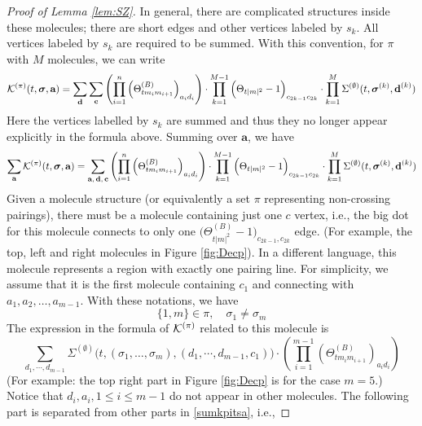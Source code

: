 \documentclass[10pt,reqno]{article}
\theoremstyle{plain} %
\theoremstyle{remark}
\numberwithin{equation}{section}
\begin{document}
\begin{proof}[ Proof of Lemma  \ref{lem:SZ}]
In general, there are complicated structures inside these molecules; there are short edges and other vertices labeled by $s_k$. All vertices labeled by $s_k$
 are required to be summed. 
With this convention,  for $\pi$  with   $M$ molecules, we can write 
\begin{align}\label{KThThSigma}
{\cal K}^{(\pi)}(t, \boldsymbol{\sigma}, \textbf{a})= 
\sum_{\textbf{d}}\sum_{\textbf{c}}\left(\prod_{i=1}^{n} \left(\Theta^{(B)}_{tm_im_{i+1}}\right)_{a_id_i}\right)\cdot \prod_{k=1}^{M-1}\Big(\Theta_{{t|m|^2}}-1\Big)_{c_{2k-1}c_{2k}}
\cdot
 \prod_{k=1}^{M}{\Sigma}^{(\emptyset)}(t, \boldsymbol{\sigma}^{(k)}, \textbf{d}^{(k)})   
\end{align}
Here the vertices labelled by $s_k$ are summed and thus they no longer appear explicitly in the formula above. 
Summing over  $\textbf{a}$,  we have 
\begin{align}\label{sumkpitsa}
\sum_{\textbf{a}}{\cal K}^{(\pi)}(t, \boldsymbol{\sigma}, \textbf{a})=
\sum_{\textbf{a},\,\textbf{d},\,\textbf{c}}\left(\prod_{i=1}^{n}  \left(\Theta^{(B)}_{tm_im_{i+1}}\right)_{a_id_i}\right)\cdot \prod_{k=1}^{M-1}\Big(\Theta_{{t|m|^2}}-1\Big)_{c_{2k-1}c_{2k}}
\cdot
 \prod_{k=1}^{M}{\Sigma}^{(\emptyset)}(t, \boldsymbol{\sigma}^{(k)}, \textbf{d}^{(k)})   
\end{align}
 Given a molecule structure (or equivalently a set $\pi$ representing non-crossing pairings), there must be a molecule  containing just one $c$ vertex, i.e., the big dot for this molecule  connects to only  one  $\big(\Theta^{(B)}_{t|m|^2}-1\big)_{c_{2k-1},c_{2k}}$ edge. (For example, the top, left and right molecules in Figure \ref{fig:Decp}). 
  In a different language, this molecule represents a region with exactly  one  pairing line.  
For simplicity, we assume that it is the first molecule  containing  $c_1$ and  connecting  with $a_1,a_2,\ldots,a_{m-1}$. 
With these notations, we have 
\begin{equation} \label{jjshsaa0}
\{1,m \}\in \pi, \quad \sigma_1\ne \sigma_{m }
\end{equation}
The expression in the formula of ${\cal K}^{(\pi)}$ related to this molecule is 
$$
\sum_{d_1,\cdots, d_{m-1}}\Sigma^{(\emptyset)}\Bigg(t, (\sigma_1,\ldots,\sigma_m), (d_1,\cdots, d_{m-1}, c_1)\Bigg)\cdot  \left(\prod_{i=1}^{m-1} \left(\Theta^{(B)}_{tm_im_{i+1}}\right)_{a_id_i}\right) 
$$
(For example: the top right part in Figure \ref{fig:Decp} is for the case $m=5$.) Notice that  $d_i, a_i, 1\le i\le m-1 $ do not  appear in other molecules.  The following part is separated  from  other parts in \eqref{sumkpitsa}, i.e., 

\end{proof}
\end{document}
